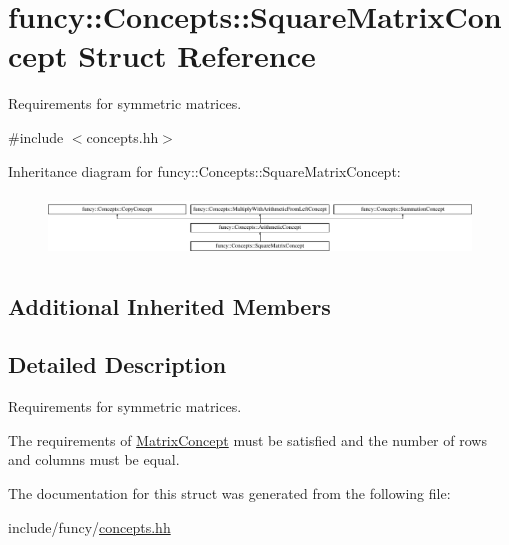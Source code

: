 \hypertarget{structfuncy_1_1Concepts_1_1SquareMatrixConcept}{\section{funcy\-:\-:Concepts\-:\-:Square\-Matrix\-Concept Struct Reference}
\label{structfuncy_1_1Concepts_1_1SquareMatrixConcept}
}


Requirements for symmetric matrices.  




{\ttfamily \#include $<$concepts.\-hh$>$}

Inheritance diagram for funcy\-:\-:Concepts\-:\-:Square\-Matrix\-Concept\-:\begin{figure}[H]
\begin{center}
\leavevmode
\includegraphics[height=1.656805cm]{structfuncy_1_1Concepts_1_1SquareMatrixConcept}
\end{center}
\end{figure}
\subsection*{Additional Inherited Members}


\subsection{Detailed Description}
Requirements for symmetric matrices. 

The requirements of \hyperlink{structfuncy_1_1Concepts_1_1MatrixConcept}{Matrix\-Concept} must be satisfied and the number of rows and columns must be equal. 

The documentation for this struct was generated from the following file\-:\begin{DoxyCompactItemize}
\item 
include/funcy/\hyperlink{concepts_8hh}{concepts.\-hh}\end{DoxyCompactItemize}
